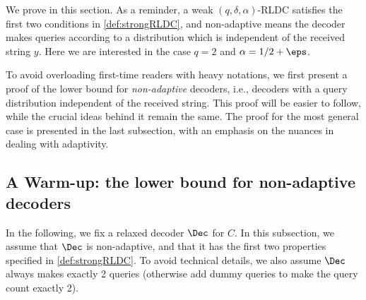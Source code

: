 We prove  in this section. As a reminder, a weak $(q,\delta,\alpha)$-RLDC satisfies the first two conditions in \cref{def:strongRLDC}, and non-adaptive means the decoder makes queries according to a distribution which is independent of the received string $y$. Here we are interested in the case $q=2$ and $\alpha=1/2+\eps$.

To avoid overloading first-time readers with heavy notations, we first present a proof of the lower bound for \emph{non-adaptive} decoders, i.e., decoders with a query distribution independent of the received string. This proof will be easier to follow, while the crucial ideas behind it remain the same. The proof for the most general case is presented in the last subsection, with an emphasis on the nuances in dealing with adaptivity.

\subsection{A Warm-up: the lower bound for non-adaptive decoders}
In the following, we fix a relaxed decoder $\Dec$ for $C$. In this subsection, we assume that $\Dec$ is non-adaptive, and that it has the first two properties specified in \cref{def:strongRLDC}. To avoid technical details, we also assume $\Dec$ always makes exactly 2 queries (otherwise add dummy queries to make the query count exactly 2).



